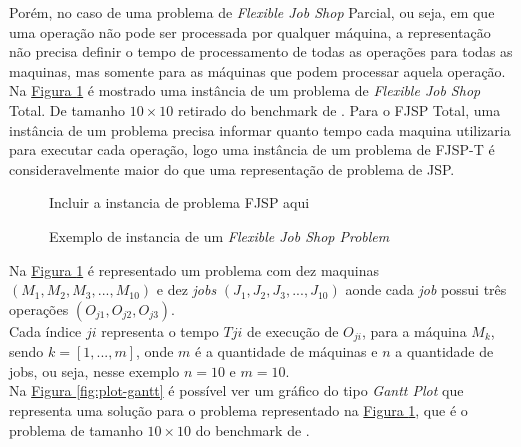             Porém, no caso de uma problema de \textit{Flexible Job Shop} Parcial, ou seja, em que uma operação não pode ser processada por qualquer máquina, a representação não precisa definir o tempo de processamento de todas as operações para todas as maquinas, mas somente para as máquinas que podem processar aquela operação.\\


            Na 
            \hyperref[fig:ex-instancia-problema-FJSP]{Figura \ref{fig:ex-instancia-problema-FJSP}} 
            é mostrado uma instância de um problema de \textit{Flexible Job Shop} Total. De tamanho $10\times10$ retirado do benchmark de \cite{Kacem2002}.
            Para o FJSP Total, uma instância de um problema precisa informar quanto tempo cada maquina utilizaria para executar cada operação, logo uma instância de um problema de FJSP-T é consideravelmente maior do que uma representação de problema de JSP.
            
            \begin{figure}[ht]
                \centering
                \small{Incluir a instancia de problema FJSP aqui}
                \caption{Exemplo de instancia de um \textit{Flexible Job Shop Problem}}
                \label{fig:ex-instancia-problema-FJSP}
            \end{figure}
            
            Na 
            \hyperref[fig:ex-instancia-problema-FJSP]{Figura \ref{fig:ex-instancia-problema-FJSP}} 
            é representado um problema com dez maquinas $(M_1, M_2, M_3, ..., M_{10})$ e dez \textit{jobs} $(J_1, J_2, J_3, ..., J_{10})$ aonde cada \textit{job} possui três operações $(O_{j1}, O_{j2}, O_{j3})$.\\
            Cada índice $ji$ representa o tempo $T{ji}$ de execução de $O_{ji}$, para a máquina $M_k$, 
            sendo $k=[1, ..., m]$, onde $m$ é a quantidade de máquinas e $n$ a quantidade de jobs, ou seja, nesse exemplo $n=10$ e $m=10$.\\
            
            


            Na 
            \hyperref[fig:plot-gantt]{Figura \ref{fig:plot-gantt}} 
            é possível ver um gráfico do tipo \textit{Gantt Plot} que representa uma solução para o problema representado na 
            \hyperref[fig:ex-instancia-problema-FJSP]{Figura \ref{fig:ex-instancia-problema-FJSP}}, 
            que é o problema de tamanho $10\times10$ do benchmark de  \cite{Kacem2002}.\\
            
